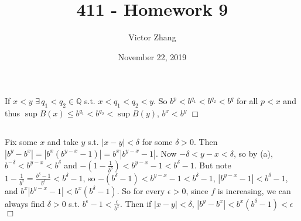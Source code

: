 \documentclass{article}
\title{411 - Homework 9}
\author{Victor Zhang }
\date{November 22, 2019}
\begin{document}
\maketitle

\section{}
\subsection{}
If $x<y$ $\exists \,q_1<q_2 \in \mathbb{Q}$ s.t. $x<q_1<q_2<y$. So $b^p < b^{q_1} < b^{q_2} < b^q$ for all $p<x$ and thus $\sup B(x) \leq b^{q_1} < b^{q_2} < \sup B(y)$, $b^x < b^y$ $\Box$

\subsection{}
Fix some $x$ and take $y$ s.t. $|x-y| < \delta$ for some $\delta > 0$. Then $|b^y - b^x| = |b^x(b^{y-x} - 1)| = b^x|b^{y-x} - 1|$. Now $-\delta < y-x < \delta$, so by (a), $b^{-\delta} < b^{y-x} < b^\delta$ and $-(1 - \frac{1}{b^\delta}) < b^{y-x} - 1 < b^\delta -1$. But note $1 - \frac{1}{b^\delta} = \frac{b^\delta - 1}{b^\delta} < b^\delta - 1$, so $-(b^\delta - 1) < b^{y-x} - 1< b^\delta -1$, $|b^{y-x}-1| < b^\delta -1$, and $b^x|b^{y-x} - 1| < b^x (b^\delta -1)$. So for every $\epsilon > 0$, since $f$ is increasing, we can always find  $\delta > 0$ s.t. $b^\epsilon - 1 < \frac{\epsilon}{b^x}$. Then if $|x-y| < \delta$, $|b^y - b^x| < b^x (b^\delta - 1) < \epsilon$ $\Box$

\section{}
\end{document}
